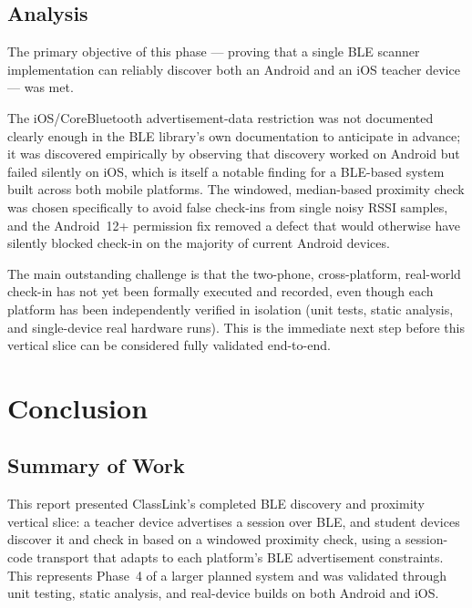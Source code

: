 \documentclass[12pt,a4paper]{report}
\begin{document}
\section{Analysis}
The primary objective of this phase --- proving that a single BLE scanner implementation can reliably discover both an Android and an iOS teacher device --- was met.

The iOS/CoreBluetooth advertisement-data restriction was not documented clearly enough in the BLE library's own documentation to anticipate in advance; it was discovered empirically by observing that discovery worked on Android but failed silently on iOS, which is itself a notable finding for a BLE-based system built across both mobile platforms. The windowed, median-based proximity check was chosen specifically to avoid false check-ins from single noisy RSSI samples, and the Android~12+ permission fix removed a defect that would otherwise have silently blocked check-in on the majority of current Android devices.

The main outstanding challenge is that the two-phone, cross-platform, real-world check-in has not yet been formally executed and recorded, even though each platform has been independently verified in isolation (unit tests, static analysis, and single-device real hardware runs). This is the immediate next step before this vertical slice can be considered fully validated end-to-end.

\chapter{Conclusion}

\section{Summary of Work}
This report presented ClassLink's completed BLE discovery and proximity vertical slice: a teacher device advertises a session over BLE, and student devices discover it and check in based on a windowed proximity check, using a session-code transport that adapts to each platform's BLE advertisement constraints. This represents Phase~4 of a larger planned system and was validated through unit testing, static analysis, and real-device builds on both Android and iOS.
\end{document}
